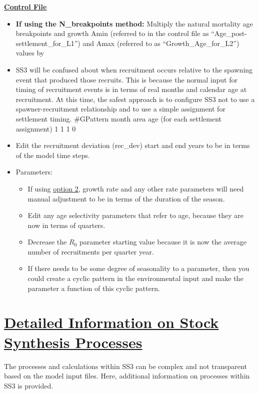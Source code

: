\textbf{\underline{Control File}}
\begin{itemize}
	\item \textbf{If using the N\_breakpoints method:} Multiply the natural mortality age breakpoints and growth Amin (referred to in the control file as ``Age\_post-settlement\_for\_L1'') and Amax (referred to as ``Growth\_Age\_for\_L2'') values by 
	\item SS3 will be confused about when recruitment occurs relative to the spawning event that produced those recruits. This is because the normal input for timing of recruitment events is in terms of real months and calendar age at recruitment. At this time, the safest approach is to configure SS3 not to use a spawner-recruitment relationship and to use a simple assignment for settlement timing.
	\#GPattern month area age (for each settlement assignment)
	 1         1     1    0
	\item Edit the recruitment deviation (rec\_dev) start and end years to be in terms of the model time steps.
	\item Parameters:
	\begin{itemize}
		\item If using \hyperlink{option2}{option 2}, growth rate and any other rate parameters will need manual adjustment to be in terms of the duration of the season.
		\item Edit any age selectivity parameters that refer to age, because they are now in terms of quarters.
		\item Decrease the $R_{0}$ parameter starting value because it is now the average number of recruitments per quarter year.
		\item If there needs to be some degree of seasonality to a parameter, then you could create a cyclic pattern in the environmental input and make the parameter a function of this cyclic pattern.
	\end{itemize}
\end{itemize}


\hypertarget{SS3Processes}{}
\section[Detailed Information on Stock Synthesis Processes]{\protect\hyperlink{SS3Processes}{Detailed Information on Stock Synthesis Processes}}

The processes and calculations within SS3 can be complex and not transparent based on the model input files. Here, additional information on processes within SS3 is provided.

